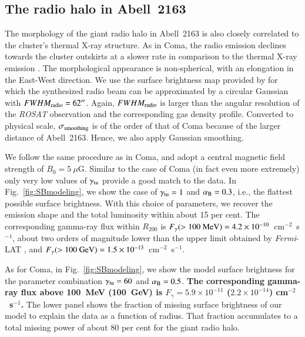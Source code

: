 \documentclass[useAMS,usenatbib]{mn2e}
\begin{document}
\subsection{The radio halo in Abell~2163}

The morphology of the giant radio halo in Abell~2163 is also closely correlated
to the cluster's thermal X-ray structure. As in Coma, the radio emission
declines towards the cluster outskirts at a slower rate in comparison to the
thermal X-ray emission \citep{2001A&A...373..106F}. The morphological appearance
is non-spherical, with an elongation in the East-West direction. We use the
surface brightness map provided by \citet{2009A&A...499..679M} for which the
synthesized radio beam can be approximated by a circular Gaussian with
$FWHM_{{\mathrm{radio}}}=62\hbox{$^{\prime\prime}$}$.  Again, $FWHM_{{\mathrm{radio}}}$ is larger than the
angular resolution of the \emph{ROSAT} observation and the corresponding gas
density profile. Converted to physical scale, $\sigma_{{\mathrm{smoothing}}}$ is of
the order of that of Coma because of the larger distance of Abell~2163. Hence,
we also apply Gaussian smoothing.

We follow the same procedure as in Coma, and adopt a central magnetic field
strength of $B_{0}=5~\mu$G. Similar to the case of Coma (in fact even more
extremely) only very low values of $\gamma_{{\mathrm{tu}}}$ provide a good match to
the data.  In Fig.~\ref{fig:SBmodeling}, we show the case of
$\gamma_{{\mathrm{tu}}}=1$ and $ \alpha_{{\mathrm{B}}}=0.3$, i.e., the flattest possible surface
brightness. With this choice of parameters, we recover the emission shape and
the total luminosity within about 15 per cent.  The corresponding gamma-ray flux
within $R_{200}$ is $F_{\gamma} (>100~{\mathrm{MeV}}) = 4.2
\times10^{-10}$~cm$^{-2}$~s$^{-1}$, about two orders of magnitude lower than the
upper limit obtained by \emph{Fermi}-LAT \citep{2010ApJ...717L..71A}, and
$F_{\gamma} (>100~{\mathrm{GeV}}) =1.5 \times10^{-13}$~cm$^{-2}$~s$^{-1}$.

As for Coma, in Fig.~\ref{fig:SBmodeling}, we show the model surface brightness
for the parameter combination $\gamma_{{\mathrm{tu}}} = 60$ and
$\alpha_{{\mathrm{B}}}=0.5$. {\bf The corresponding gamma-ray flux above 100~MeV
  (100~GeV) is $F_{\gamma} = 5.9 \times 10^{-11}$ ($2.2 \times 10^{-14}$)
  cm$^{-2}$~s$^{-1}$.} The lower panel shows the fraction of missing surface
brightness of our model to explain the data as a function of radius. That
fraction accumulates to a total missing power of about 80 per cent for the giant
radio halo.
\end{document}
